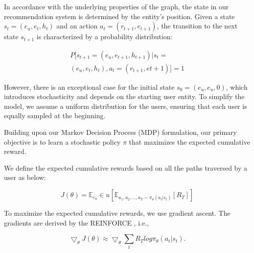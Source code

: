 \documentclass[11pt]{article}
\begin{document}
In accordance with the underlying properties of the graph, the state in our recommendation system is determined by the entity's position. Given a state $s_{t} = (e_{u}, e_{t}, h_{t})$  and an action $a_{t} = (r_{t+1}, e_{t+1})$, the transition to the next state $s_{t+1}$ is characterized by a probability distribution:

\begin{equation}
\begin{split}
P[s_{t+1} = (e_{u}, e_{t+1}, h_{t+1}) | s_{t} = \\
(e_{u}, e_{t}, h_{t}), a_{t} = (r_{t+1}, e{t+1})] = 1
\end{split}
\end{equation}

However, there is an exceptional case for the initial state $s_{0} = (e_{u}, e_{u}, 0)$, which introduces stochasticity and depends on the starting user entity. To simplify the model, we assume a uniform distribution for the users, ensuring that each user is equally sampled at the beginning.

Building upon our Markov Decision Process (MDP) formulation, our primary objective is to learn a stochastic policy $\pi$ that maximizes the expected cumulative reward.

We define the expected cumulative rewards based on all the paths traversed by a user as below:

\begin{equation}
J(\theta ) = \mathbb{E}_{e_{0}}\in u [\mathbb{E}_{a_{1}, a_{2}, ..., a_{T} \sim \pi_{\theta}(a_{t}|s_{t})} [R_{T}]]
\end{equation}

To maximize the expected cumulative rewards, we use gradient ascent. The gradients are derived by the REINFORCE \cite{sutton2018reinforcement}, i.e.,

\begin{equation}
\bigtriangledown_{\theta} J(\theta) \approx \bigtriangledown_{\theta} \sum_{t} R_{T}  log  \pi_{\theta}(a_{t}|s_{t}).
\end{equation}
\end{document}

